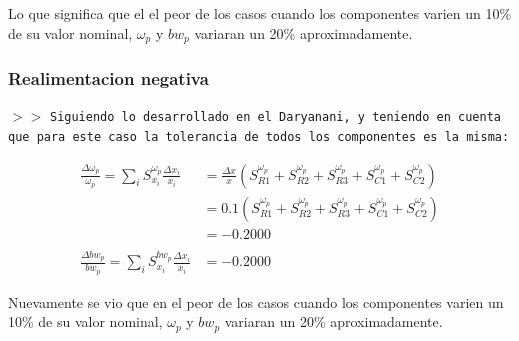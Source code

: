 Lo que significa que el el peor de los casos cuando los componentes varien un 10\% de su valor nominal, $\omega_{p}$ y $bw_{p}$ variaran un 20\% aproximadamente.

\subsubsection{Realimentacion negativa}

\noindent $>>$ \texttt{Siguiendo lo desarrollado en el Daryanani, y teniendo en cuenta que para este caso la tolerancia de todos los componentes es la misma:}

\begin{align*}
    \frac{\Delta\omega_{p}}{\omega_{p}} 
    = \sum_{i} S^{\omega_p}_{x_i} \frac{\Delta x_{i}}{x_{i}} 
    &= \frac{\Delta x}{x} (S^{\omega_{p}}_{R1}+S^{\omega_{p}}_{R2}+S^{\omega_{p}}_{R3}+S^{\omega_{p}}_{C1}+S^{\omega_{p}}_{C2}) \\ 
    &= 0.1 (S^{\omega_{p}}_{R1}+S^{\omega_{p}}_{R2}+S^{\omega_{p}}_{R3}+S^{\omega_{p}}_{C1}+S^{\omega_{p}}_{C2}) \\
    &= -0.2000 \\\\
    \frac{\Delta bw_{p}}{bw_{p}} 
    = \sum_{i} S^{bw_p}_{x_i} \frac{\Delta x_{i}}{x_{i}} 
    &= -0.2000
\end{align*}

Nuevamente se vio que en el peor de los casos cuando los componentes varien un 10\% de su valor nominal, $\omega_{p}$ y $bw_{p}$ variaran un 20\% aproximadamente.